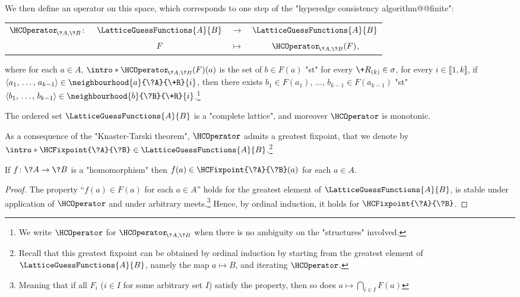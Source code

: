 We then define an operator on this space, which corresponds to one step of the "hyperedge consistency algorithm@@finite":
\begin{center}
	\begin{tabular}{rccc}
		$\HCOperator_{\!\?A,\?B}\colon$ & $\LatticeGuessFunctions{A}{B}$ & $\to$ & $\LatticeGuessFunctions{A}{B}$ \\
		& $F$ & $\mapsto$ & $\HCOperator_{\!\?A,\?B}(F)$,
	\end{tabular}
\end{center}
where for each $a \in A$, \AP$\intro*\HCOperator_{\!\?A,\?B}(F)(a)$ is the set of $b \in F(a)$ "st"
for every $\+R_{(k)} \in \sigma$, for every $i \in \lBrack 1,k\rBrack$,
if $\langle a_1,\, \hdots,\, a_{k-1} \rangle \in \neighbourhood{a}{\?A}{\+R}{i}$,
then there exists $b_1 \in F(a_1)$, $\hdots$, $b_{k-1} \in F(a_{k-1})$ "st" 
$\langle b_1,\, \hdots,\, b_{k-1} \rangle \in \neighbourhood{b}{\?B}{\+R}{i}$.\footnote{%
We write $\HCOperator$ for $\HCOperator_{\!\?A,\?B}$ when there is no ambiguity on
the "structures" involved.}

\begin{fact}
	The ordered set $\LatticeGuessFunctions{A}{B}$ is a "complete lattice",
	and moreover $\HCOperator$ is monotonic.
\end{fact}

As a consequence of the "Knaster-Tarski theorem", $\HCOperator$ admits a greatest fixpoint, that
we denote by \AP$\intro*\HCFixpoint{\?A}{\?B} \in \LatticeGuessFunctions{A}{B}$.\footnote{Recall 
that this greatest fixpoint can be obtained by ordinal induction by starting from
the greatest element of $\LatticeGuessFunctions{A}{B}$, namely the map $a \mapsto B$,
and iterating $\HCOperator$.}

\begin{proposition}
	\AP\label{prop:existence-homomorphism-implies-lowerbound-HC}
	If $f\colon \?A \to \?B$ is a "homomorphism" then $f(a) \in \HCFixpoint{\?A}{\?B}(a)$
	for each $a \in A$.
\end{proposition}

\begin{proof}
	The property ``$f(a) \in F(a)$ for each $a\in A$'' holds for the greatest element
	of $\LatticeGuessFunctions{A}{B}$, is stable under application of $\HCOperator$ and
	under arbitrary meets.\footnote{Meaning that if all $F_i$ ($i \in I$ for some arbitrary set $I$)
	satisfy the property, then so does $a \mapsto \bigcap_{i \in I} F(a)$}
	Hence, by ordinal induction, it holds for $\HCFixpoint{\?A}{\?B}$.
\end{proof}

